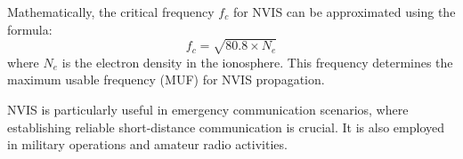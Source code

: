 Mathematically, the critical frequency \( f_c \) for NVIS can be approximated using the formula:
\[
f_c = \sqrt{80.8 \times N_e}
\]
where \( N_e \) is the electron density in the ionosphere. This frequency determines the maximum usable frequency (MUF) for NVIS propagation. 

NVIS is particularly useful in emergency communication scenarios, where establishing reliable short-distance communication is crucial. It is also employed in military operations and amateur radio activities.

